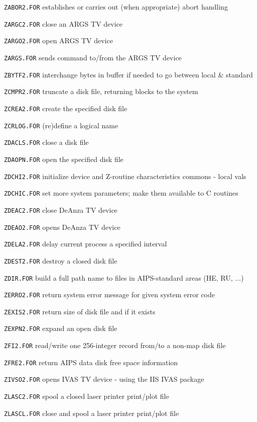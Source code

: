 {\item{\tt ZABOR2.FOR} establishes or carries out (when appropriate) abort handling
\item{\tt ZARGC2.FOR} close an ARGS TV device
\item{\tt ZARGO2.FOR} open ARGS TV device
\item{\tt ZARGS.FOR} sends command to/from the ARGS TV device
\item{\tt ZBYTF2.FOR} interchange bytes in buffer if needed to go between local \& standard
\item{\tt ZCMPR2.FOR} truncate a disk file, returning blocks to the system
\item{\tt ZCREA2.FOR} create the specified disk file
\item{\tt ZCRLOG.FOR} (re)define a logical name
\item{\tt ZDACLS.FOR} close a disk file
\item{\tt ZDAOPN.FOR} open the specified disk file
\item{\tt ZDCHI2.FOR} initialize device and Z-routine characteristics commons - local vals
\item{\tt ZDCHIC.FOR} set more system parameters; make them available to C routines
\item{\tt ZDEAC2.FOR} close DeAnza TV device
\item{\tt ZDEAO2.FOR} opens DeAnza TV device
\item{\tt ZDELA2.FOR} delay current process a specified interval
\item{\tt ZDEST2.FOR} destroy a closed disk file
\item{\tt ZDIR.FOR} build a full path name to files in AIPS-standard areas (HE, RU, $\dots$)
\item{\tt ZERRO2.FOR} return system error message for given system error code
\item{\tt ZEXIS2.FOR} return size of disk file and if  it exists
\item{\tt ZEXPN2.FOR} expand an open disk file
\item{\tt ZFI2.FOR} read/write one 256-integer record from/to a non-map disk file
\item{\tt ZFRE2.FOR} return AIPS data disk free space information
\item{\tt ZIVSO2.FOR} opens IVAS TV device - using the IIS IVAS package
\item{\tt ZLASC2.FOR} spool a closed laser printer print/plot file
\item{\tt ZLASCL.FOR} close and spool a laser printer print/plot file
}
